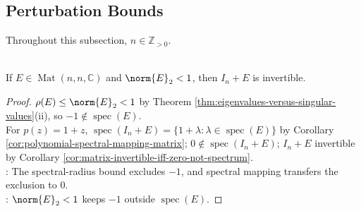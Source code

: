 \subsection{Perturbation Bounds}

Throughout this subsection, $n\in\mathbb{Z}_{>0}$.

\begin{lemma} \label{lem:small-spectral-norm-perturbation-invertible} \\
If $E\in\operatorname{Mat}(n,n,\mathbb{C})$ and $\norm{E}_2<1$, then $I_n+E$ is invertible.
\begin{proof}
$\rho(E)\leq\norm{E}_2<1$ by Theorem \ref{thm:eigenvalues-versus-singular-values}(ii), so $-1\notin\operatorname{spec}(E)$.\\
For $p(z)=1+z$, $\operatorname{spec}(I_n+E)=\{1+\lambda:\lambda\in\operatorname{spec}(E)\}$ by Corollary \ref{cor:polynomial-spectral-mapping-matrix}; $0\notin\operatorname{spec}(I_n+E)$; $I_n+E$ invertible by Corollary \ref{cor:matrix-invertible-iff-zero-not-spectrum}.\\
: The spectral-radius bound excludes $-1$, and spectral mapping transfers the exclusion to $0$.\\
: $\norm{E}_2<1$ keeps $-1$ outside $\operatorname{spec}(E)$.
\end{proof}
\end{lemma}

